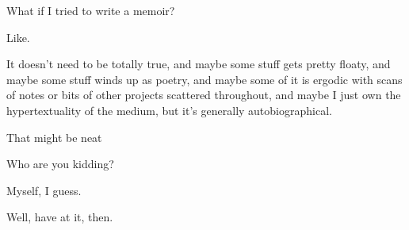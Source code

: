 \label{ally:1}
\begin{paracol}{2}
  \begin{leftcolumn}

\noindent What if I tried to write a memoir?

Like.

It doesn't need to be totally true, and maybe some stuff gets pretty floaty, and maybe some stuff winds up as poetry, and maybe some of it is ergodic with scans of notes or bits of other projects scattered throughout, and maybe I just own the hypertextuality of the medium, but it's generally autobiographical.

That might be neat

\begin{ally}
Who are you kidding?
\end{ally}
Myself, I guess.

\begin{ally}
Well, have at it, then.
\end{ally}
\newpage

\end{leftcolumn}
\end{paracol}
